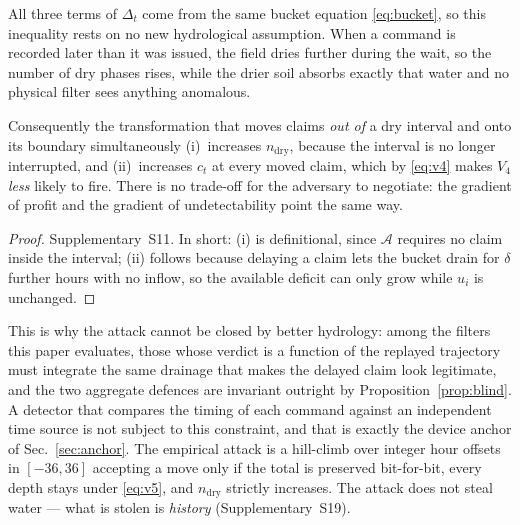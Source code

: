 \begin{proposition}
All three terms of $\Delta_t$ come from the same bucket equation \eqref{eq:bucket}, so
this inequality rests on no new hydrological assumption. When a command is recorded
later than it was issued, the field dries further during the wait, so the number of dry
phases rises, while the drier soil absorbs exactly that water and no physical filter
sees anything anomalous.

Consequently the transformation that moves claims \emph{out of} a dry interval
and onto its boundary simultaneously (i)~increases $n_{\mathrm{dry}}$, because
the interval is no longer interrupted, and (ii)~increases $c_t$ at every moved
claim, which by \eqref{eq:v4} makes $V_4$ \emph{less} likely to fire. There is
no trade-off for the adversary to negotiate: the gradient of profit and the
gradient of undetectability point the same way.
\end{proposition}

\begin{proof}
Supplementary~S11. In short: (i) is definitional, since $\mathcal{A}$ requires
no claim inside the interval; (ii) follows because delaying a claim lets the
bucket drain for $\delta$ further hours with no inflow, so the available
deficit can only grow while $u_i$ is unchanged.
\end{proof}

This is why the attack cannot be closed by better hydrology: among the filters this paper evaluates, those whose verdict is a function of the
replayed trajectory must integrate the same drainage that makes the delayed claim
look legitimate, and the two aggregate defences are invariant outright by
Proposition~\ref{prop:blind}. A detector that compares the timing of each command
against an independent time source is not subject to this constraint, and that is
exactly the device anchor of Sec.~\ref{sec:anchor}. The empirical attack is
a hill-climb over integer hour offsets in $[-36,36]$ accepting a move only if
the total is preserved bit-for-bit, every depth stays under \eqref{eq:v5}, and
$n_{\mathrm{dry}}$ strictly increases. The attack does not steal water ---
what is stolen is \emph{history} (Supplementary~S19).
